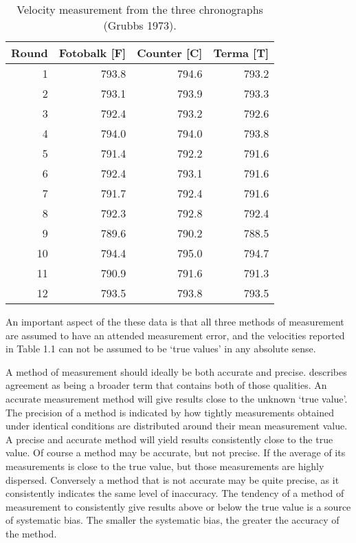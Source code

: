 \documentclass[12pt, a4paper]{report}
\begin{document}
\begin{table}[ht]
	\begin{center}
		\begin{tabular}{|r|r|r|r|}
			\hline
			Round& Fotobalk [F] & Counter [C]& Terma [T]\\
			\hline
			1 & 793.8 & 794.6 & 793.2 \\
			2 & 793.1 & 793.9 & 793.3 \\
			3 & 792.4 & 793.2 & 792.6 \\
			4 & 794.0 & 794.0 & 793.8 \\
			5 & 791.4 & 792.2 & 791.6 \\
			6 & 792.4 & 793.1 & 791.6 \\
			7 & 791.7 & 792.4 & 791.6 \\
			8 & 792.3 & 792.8 & 792.4 \\
			9 & 789.6 & 790.2 & 788.5 \\
			10 & 794.4 & 795.0 & 794.7 \\
			11 & 790.9 & 791.6 & 791.3 \\
			12 & 793.5 & 793.8 & 793.5 \\
			\hline
		\end{tabular}
		\caption{Velocity measurement from the three chronographs (Grubbs
			1973).}
	\end{center}
\end{table}

An important aspect of the these data is that all three methods of
measurement are assumed to have an attended measurement error, and
the velocities reported in Table 1.1 can not be assumed to be
`true values' in any absolute sense.


A method of measurement should ideally be both accurate and
precise. \citet{Barnhart} describes agreement as being a broader
term that contains both of those qualities. An accurate
measurement method will give results close to the unknown `true
value'. The precision of a method is indicated by how tightly
measurements obtained under identical conditions are distributed
around their mean measurement value. A precise and accurate method
will yield results consistently close to the true value. Of course
a method may be accurate, but not precise. If the average of its
measurements is close to the true value, but those measurements
are highly dispersed. Conversely a method that is not accurate may
be quite precise, as it consistently indicates the same level of
inaccuracy. The tendency of a method of measurement to
consistently give results above or below the true value is a
source of systematic bias. The smaller the systematic bias, the
greater the accuracy of the method.
\end{document}
